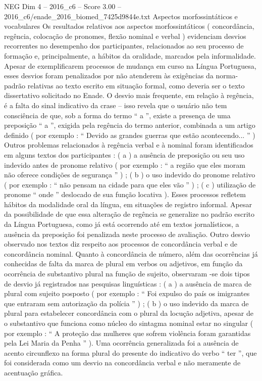 \begin{textsample}{NEG Dim 4 – 2016\_c6 – Score 3.00 – 2016\_c6/enade\_2016\_biomed\_7425d9844e.txt}
Aspectos morfossintáticos e vocabulares Os resultados relativos aos aspectos morfossintáticos ( concordância, regência, colocação de pronomes, flexão nominal e verbal ) evidenciam desvios recorrentes no desempenho dos participantes, relacionados ao seu processo de formação e, principalmente, a hábitos da oralidade, marcados pela informalidade.
Apesar de exemplificarem processos de mudança em curso na Língua Portuguesa, esses desvios foram penalizados por não atenderem às exigências da norma-padrão relativas ao texto escrito em situação formal, como deveria ser o texto dissertativo solicitado no Enade.
O desvio mais frequente, em relação à regência, é a falta do sinal indicativo da crase – isso revela que o usuário não tem consciência de que, sob a forma do termo “ a ”, existe a presença de uma preposição “ a ”, exigida pela regência do termo anterior, combinada a um artigo definido ( por exemplo : “ Devido as grandes guerras que estão acontecendo... ” ) Outros problemas relacionados à regência verbal e à nominal foram identificados em alguns textos dos participantes : ( a ) a ausência de preposição ou seu uso indevido antes de pronome relativo ( por exemplo : “ a região que eles moram não oferece condições de segurança ” ) ; ( b ) o uso indevido do pronome relativo ( por exemplo : “ não pensam na cidade para que eles vão ” ) ; ( c ) utilização de pronome “ onde ” deslocado de sua função locativa ).
Esses processos refletem hábitos da modalidade oral da língua, em situações de registro informal.
Apesar da possibilidade de que essa alteração de regência se generalize no padrão escrito da Língua Portuguesa, como já está ocorrendo até em textos jornalísticos, a ausência da preposição foi penalizada neste processo de avaliação.
Outro desvio observado nos textos diz respeito aos processos de concordância verbal e de concordância nominal.
Quanto à concordância de número, além das ocorrências já conhecidas de falta da marca de plural em verbos ou adjetivos, em função da ocorrência de substantivo plural na função de sujeito, observaram -se dois tipos de desvio já registrados nas pesquisas linguísticas : ( a ) a ausência de marca de plural com sujeito posposto ( por exemplo : “ Foi expulso do país os imigrantes que entraram sem autorização da polícia ” ) ; ( b ) o uso indevido da marca de plural para estabelecer concordância com o plural da locução adjetiva, apesar de o substantivo que funciona como núcleo do sintagma nominal estar no singular ( por exemplo : “ A proteção das mulheres que sofrem violência foram garantidas pela Lei Maria da Penha ” ).
Uma ocorrência generalizada foi a ausência de acento circunflexo na forma plural do presente do indicativo do verbo “ ter ”, que foi considerada como um desvio na concordância verbal e não meramente de acentuação gráfica.

\end{textsample}
